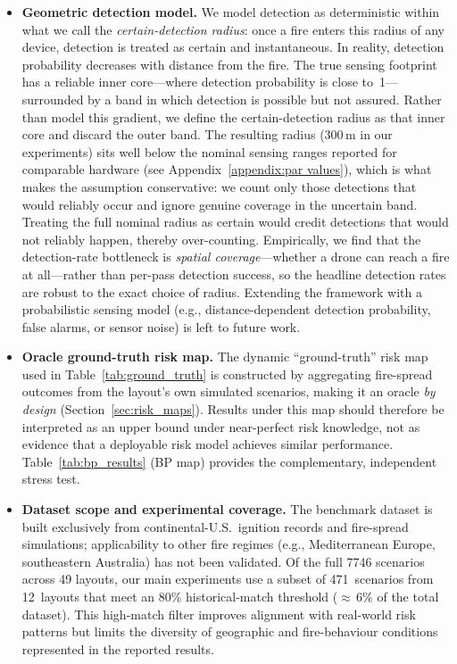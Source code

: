 \documentclass{article}
\newcommand{\layoutsNo}{49}
\newcommand{\scenariosNo}{7746}
\begin{document}
\begin{itemize}[leftmargin=*,itemsep=2pt,topsep=2pt]
\item \textbf{Geometric detection model.}
We model detection as deterministic within what we call the \emph{certain-detection radius}: once a fire enters this radius of any device, detection is treated as certain and instantaneous. In reality, detection probability decreases with distance from the fire. The true sensing footprint has a reliable inner core---where detection probability is close to~1---surrounded by a band in which detection is possible but not assured. Rather than model this gradient, we define the certain-detection radius as that inner core and discard the outer band. The resulting radius (300\,m in our experiments) sits well below the nominal sensing ranges reported for comparable hardware (see Appendix~\ref{appendix:par values}), which is what makes the assumption conservative: we count only those detections that would reliably occur and ignore genuine coverage in the uncertain band. Treating the full nominal radius as certain would credit detections that would not reliably happen, thereby over-counting. Empirically, we find that the detection-rate bottleneck is \emph{spatial coverage}---whether a drone can reach a fire at all---rather than per-pass detection success, so the headline detection rates are robust to the exact choice of radius. Extending the framework with a probabilistic sensing model (e.g., distance-dependent detection probability, false alarms, or sensor noise) is left to future work.

\item \textbf{Oracle ground-truth risk map.}
The dynamic ``ground-truth'' risk map used in Table~\ref{tab:ground_truth} is constructed by aggregating fire-spread outcomes from the layout's own simulated scenarios, making it an oracle \emph{by design} (Section~\ref{sec:risk_maps}). Results under this map should therefore be interpreted as an upper bound under near-perfect risk knowledge, not as evidence that a deployable risk model achieves similar performance. Table~\ref{tab:bp_results} (BP map) provides the complementary, independent stress test.

\item \textbf{Dataset scope and experimental coverage.}
The benchmark dataset is built exclusively from continental-U.S.\ ignition records and fire-spread simulations; applicability to other fire regimes (e.g., Mediterranean Europe, southeastern Australia) has not been validated. Of the full \scenariosNo{} scenarios across \layoutsNo{} layouts, our main experiments use a subset of 471~scenarios from 12~layouts that meet an 80\% historical-match threshold (${\approx}\,6\%$ of the total dataset). This high-match filter improves alignment with real-world risk patterns but limits the diversity of geographic and fire-behaviour conditions represented in the reported results.


\end{itemize}
\end{document}
